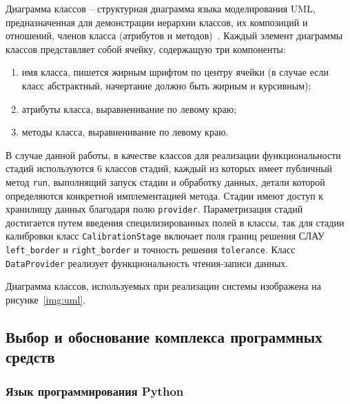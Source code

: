 Диаграмма классов -- структурная диаграмма языка моделирования UML, предназначенная для демонстрации иерархии классов,
их композиций и отношений, членов класса (атрибутов и методов)~\autocite{impl:ad}. Каждый элемент диаграммы классов представляет собой
ячейку, содержащую три компоненты:
\begin{enumerate}
    \item имя класса, пишется жирным шрифтом по центру ячейки (в случае если класс абстрактный, начертание должно быть жирным
    и курсивным);
    \item атрибуты класса, выравненивание по левому краю;
    \item методы класса, выравненивание по левому краю.
\end{enumerate}

В случае данной работы, в качестве классов для реализации функциональности стадий используются 6 классов стадий, каждый
из которых имеет публичный метод \texttt{run}, выполнящий запуск стадии и обработку данных, детали которой определяются
конкретной имплементацией метода. Стадии имеют доступ к хранилищу данных благодаря полю \texttt{provider}. Параметризация
стадий достигается путем введения специлизированных полей в классы, так для стадии калибровки класс \texttt{CalibrationStage}
включает поля границ решения СЛАУ \texttt{left\_border} и \texttt{right\_border} и точность решения \texttt{tolerance}. Класс
\texttt{DataProvider} реализует функциональность чтения-записи данных. 

Диаграмма классов, используемых при реализации системы изображена
на рисунке~\eqref{img:uml}.


\subsection{Выбор и обоснование комплекса программных средств}
\subsubsection{Язык программирования Python}

